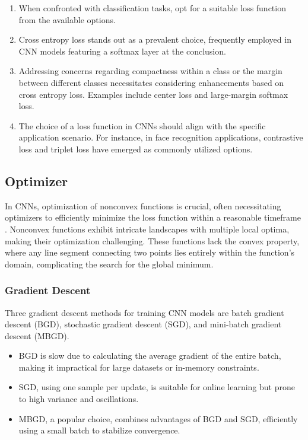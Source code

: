 \begin{itemize}
\begin{enumerate}
			\item When confronted with classification tasks, opt for a suitable loss function from the available options.
			
			\item Cross entropy loss stands out as a prevalent choice, frequently employed in CNN models featuring a softmax layer at the conclusion.
			
			\item Addressing concerns regarding compactness within a class or the margin between different classes necessitates considering enhancements based on cross entropy loss. Examples include center loss and large-margin softmax loss.
			
			\item The choice of a loss function in CNNs should align with the specific application scenario. For instance, in face recognition applications, contrastive loss and triplet loss have emerged as commonly utilized options.
		\end{enumerate}
	
	\end{itemize}

\subsection{Optimizer}
\label{subsection:optimizer}

In CNNs, optimization of nonconvex functions is crucial, often necessitating optimizers to efficiently minimize the loss function within a reasonable timeframe \cite{Li:2021}. Nonconvex functions exhibit intricate landscapes with multiple local optima, making their optimization challenging. These functions lack the convex property, where any line segment connecting two points lies entirely within the function's domain, complicating the search for the global minimum.

\subsubsection{Gradient Descent}

Three gradient descent methods for training CNN models are batch gradient descent (BGD), stochastic gradient descent (SGD), and mini-batch gradient descent (MBGD).

\begin{itemize}
	\item BGD is slow due to calculating the average gradient of the entire batch, making it impractical for large datasets or in-memory constraints.
	\item SGD, using one sample per update, is suitable for online learning but prone to high variance and oscillations.
	\item MBGD, a popular choice, combines advantages of BGD and SGD, efficiently using a small batch to stabilize convergence.
\end{itemize}

